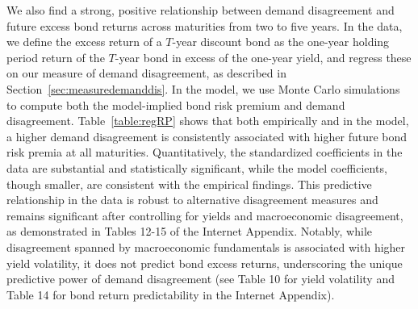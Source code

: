\documentclass[preprint,11pt,authoryear]{elsarticle}
\theoremstyle{plain}
\begin{document}
We also find a strong, positive relationship between demand disagreement and future excess bond returns across maturities from two to five years. In the data, we define the excess return of a $T$-year discount bond as the one-year holding period return of the $T$-year bond in excess of the one-year yield, and regress these on our measure of demand disagreement, as described in Section~\ref{sec:measuredemanddis}. In the model, we use Monte Carlo simulations to compute both the model-implied bond risk premium and demand disagreement. Table~\ref{table:regRP} shows that both empirically and in the model, a higher demand disagreement is consistently associated with higher future bond risk premia at all maturities. Quantitatively, the standardized coefficients in the data are substantial and statistically significant, while the model coefficients, though smaller, are consistent with the empirical findings. This predictive relationship in the data is robust to alternative disagreement measures and remains significant after controlling for yields and macroeconomic disagreement, as demonstrated in Tables 12-15 of the Internet Appendix. Notably, while disagreement spanned by macroeconomic fundamentals is associated with higher yield volatility, it does not predict bond excess returns, underscoring the unique predictive power of demand disagreement (see Table 10 for yield volatility and Table 14 for bond return predictability in the Internet Appendix).

 
\end{document}
